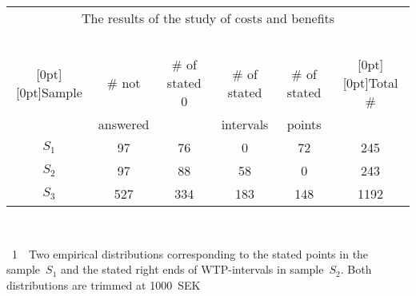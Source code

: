 \begin{multicols}{2}
{\begin{center}
\tabcolsep=1.4pt
\begin{tabular}{cccccc}
\multicolumn{6}{c}{The results of the study of costs and benefits}\\
\multicolumn{6}{c}{\ }\\[-6pt]
  \hline
 \multicolumn{1}{c}{\raisebox{-6pt}[0pt][0pt]{Sample}} & \# not  & \# of stated 0 & \# of stated &
   \# of stated &  \multicolumn{1}{c}{\raisebox{-6pt}[0pt][0pt]{Total \#}}  \\
    & answered & & intervals & points &      \\ 
    \hline
  $S_1$ & 97 & 76 & \hphantom{9}0 & 72 & 245 \\ 
  $S_2$ & 97 & 88 & 58 & \hphantom{9}0 & 243 \\ 
  $S_3$ & 527\hphantom{9} & 334\hphantom{9} & 183\hphantom{9} & 148\hphantom{9} & 1192\hphantom{9} \\ 
  \hline
  \end{tabular}
  \end{center}}

\begin{center}  %
\vspace*{9pt}
\mbox{%
 \epsfxsize=77.93mm
 }

\end{center}


\noindent
{{\figurename~1}\ \ \small{Two empirical distributions corresponding to the stated points in the sample~$S_1$ and
the stated right ends of  WTP-intervals in sample~$S_2$. 
Both distributions are trimmed at 1000~SEK}}

\addtocounter{figure}{1}

\begin{figure*} %
       \vspace*{1pt}
 \begin{center}
 \mbox{%
 \epsfxsize=158.849mm
 }
 \end{center}
 \vspace*{-9pt}
\end{figure*}







\end{multicols}

